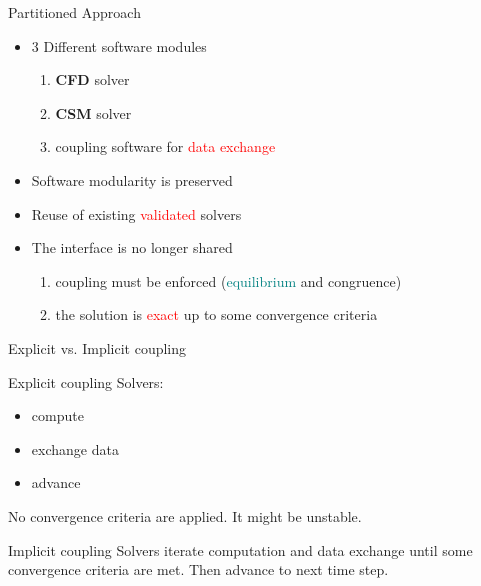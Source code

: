 \documentclass[10pt,t]{beamer}
\begin{document}
\begin{frame}{Partitioned Approach}
    \begin{itemize}
        \item  3 Different software modules
            \begin{enumerate}
                \itemsep 5pt
                \item \textbf{CFD} solver
                \item \textbf{CSM} solver
                \item coupling software for \textcolor{red}{data exchange}
            \end{enumerate}
        \vspace{5mm}
        \pause
        \item Software modularity is preserved
        \item Reuse of existing \textcolor{red}{validated} solvers
        
        \vspace{5mm}
        \pause
        
        \item The interface is no longer shared
        
        \begin{enumerate}
            \itemsep 5pt
            \item coupling must be enforced (\textcolor{teal}{equilibrium} and \textcolor{pblue}{congruence})
            \item the solution is \textcolor{red}{exact} up to some convergence criteria
        \end{enumerate}
    \end{itemize}
\end{frame}


\begin{frame}{Explicit vs. Implicit coupling}

\begin{block}{Explicit coupling}
Solvers:
\begin{itemize}
    \item \textcolor{dblue}{compute}
    \item \textcolor{fgreen}{exchange data}
    \item \textcolor{dorange}{advance} 
\end{itemize}
No convergence criteria are applied. It might be unstable.
\end{block}

\pause

\vspace{5mm}
\begin{exampleblock}{Implicit coupling}
Solvers iterate \textcolor{dblue}{computation} and \textcolor{fgreen}{data exchange} until some convergence criteria are met. Then \textcolor{dorange}{advance} to next time step.
\end{exampleblock}
\label{coupling}
\hyperlink{couplingdetails}{}

\end{frame}
\end{document}
